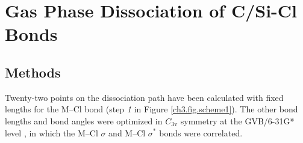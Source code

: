 \section{\label{ch3.sec.gasphase}Gas Phase Dissociation of C/Si-Cl Bonds}

\subsection{Methods}

Twenty-two points on the dissociation path have been calculated with fixed lengths for the \mbox{M--Cl} bond (step \textit{1} in Figure \ref{ch3.fig.scheme1}). The other bond lengths and bond angles were optimized in $C_\mathrm{3v}$ symmetry at the \mbox{GVB/6-31G*} level \cite{gvb1,gvb2,gvb3,gvb4}, in which the \mbox{M--Cl} $\sigma$ and \mbox{M--Cl} $\sigma^{*}$ bonds were correlated.
